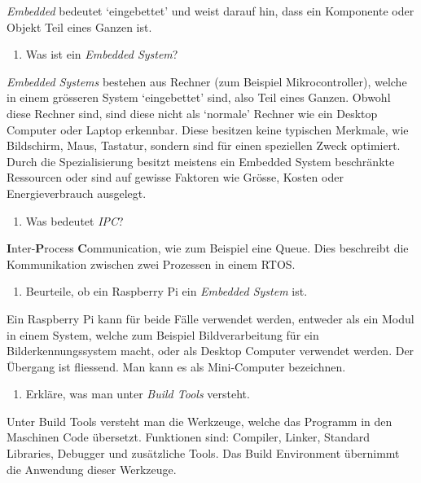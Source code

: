 \documentclass[
  10pt,
  a4paper,
]{article}
\providecommand{\tightlist}{%
  \setlength{\itemsep}{0pt}\setlength{\parskip}{0pt}}\usepackage{longtable,booktabs,array}
\numberwithin{equation}{section}
\begin{document}
\emph{Embedded} bedeutet `eingebettet' und weist darauf hin, dass ein
Komponente oder Objekt Teil eines Ganzen ist.

\begin{enumerate}
\def\labelenumi{\arabic{enumi}.}
\setcounter{enumi}{1}
\tightlist
\item
  Was ist ein \emph{Embedded System}?
\end{enumerate}

\emph{Embedded Systems} bestehen aus Rechner (zum Beispiel
Mikrocontroller), welche in einem grösseren System `eingebettet' sind,
also Teil eines Ganzen. Obwohl diese Rechner sind, sind diese nicht als
`normale' Rechner wie ein Desktop Computer oder Laptop erkennbar. Diese
besitzen keine typischen Merkmale, wie Bildschirm, Maus, Tastatur,
sondern sind für einen speziellen Zweck optimiert. Durch die
Spezialisierung besitzt meistens ein Embedded System beschränkte
Ressourcen oder sind auf gewisse Faktoren wie Grösse, Kosten oder
Energieverbrauch ausgelegt.

\begin{enumerate}
\def\labelenumi{\arabic{enumi}.}
\setcounter{enumi}{2}
\tightlist
\item
  Was bedeutet \emph{IPC}?
\end{enumerate}

\textbf{I}nter-\textbf{P}rocess \textbf{C}ommunication, wie zum Beispiel
eine Queue. Dies beschreibt die Kommunikation zwischen zwei Prozessen in
einem RTOS.

\begin{enumerate}
\def\labelenumi{\arabic{enumi}.}
\setcounter{enumi}{3}
\tightlist
\item
  Beurteile, ob ein Raspberry Pi ein \emph{Embedded System} ist.
\end{enumerate}

Ein Raspberry Pi kann für beide Fälle verwendet werden, entweder als ein
Modul in einem System, welche zum Beispiel Bildverarbeitung für ein
Bilderkennungssystem macht, oder als Desktop Computer verwendet werden.
Der Übergang ist fliessend. Man kann es als Mini-Computer bezeichnen.

\begin{enumerate}
\def\labelenumi{\arabic{enumi}.}
\setcounter{enumi}{4}
\tightlist
\item
  Erkläre, was man unter \emph{Build Tools} versteht.
\end{enumerate}

Unter Build Tools versteht man die Werkzeuge, welche das Programm in den
Maschinen Code übersetzt. Funktionen sind: Compiler, Linker, Standard
Libraries, Debugger und zusätzliche Tools. Das Build Environment
übernimmt die Anwendung dieser Werkzeuge.
\end{document}
